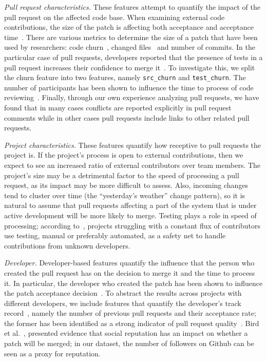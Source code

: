 \documentclass{sig-alternate}
\begin{document}
  \emph{Pull request characteristics.} These features attempt to quantify the
  impact of the pull request on the affected code base. When examining external
  code contributions, the size of the patch is affecting both acceptance and
  acceptance time~\cite{Weiss08}. There are various metrics to determine the
  size of a patch that have been used by researchers: code churn~\cite{Nagap05},
  changed files~\cite{Nagap05} and number of commits.
  In the particular case of pull requests, developers reported that the presence
  of tests in a pull request increases their confidence to merge
  it~\cite{Pham13}. To investigate this, we split the churn feature into two
  features, namely \texttt{src\_churn} and \texttt{test\_churn}. The
  number of participants has been shown to influence the time to process of code
  reviewing~\cite{Rigby13}. Finally, through our own experience analyzing pull
  requests, we have found that in many cases conflicts are reported explicitly
  in pull request comments while in other cases pull requests include links to
  other related pull requests.

  \emph{Project characteristics.} These features quantify how receptive to pull
  requests the project is. If the project's process is open to external
  contributions, then we expect to see an increased ratio of external
  contributors over team members. The project's size may be a detrimental factor
  to the speed of processing a pull request, as its impact may be more difficult
  to assess. Also, incoming changes tend to cluster over time (the ``yesterday's
  weather'' change pattern), so it is natural to assume that pull
  requests affecting a part of the system that is under active development will
  be more likely to merge. Testing plays a role in speed of processing;
  according to~\cite{Pham13}, projects struggling with a constant flux of
  contributors use testing, manual or preferably automated, as a safety net to
  handle contributions from unknown developers.

  \emph{Developer.}  Developer-based features quantify the influence that the
  person who created the pull request has on the decision to merge it and the
  time to process it. In particular, the developer who created the patch has
  been shown to influence the patch acceptance decision~\cite{Jeong09}. To
  abstract the results across projects with different developers, we include
  features that quantify the developer's track record~\cite{Dabbi12}, namely the
  number of previous pull requests and their acceptance rate; the former has
  been identified as a strong indicator of pull request quality~\cite{Pham13}.
  Bird et al.~\cite{Bird07}, presented evidence that social reputation has an
  impact on whether a patch will be merged; in our dataset, the number of
  followers on Github can be seen as a proxy for reputation.
\end{document}
